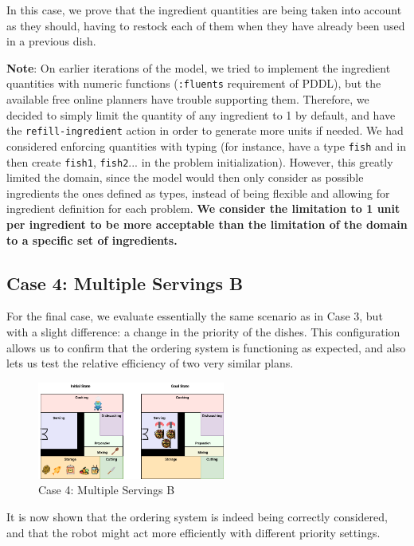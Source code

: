\documentclass{article}
\begin{document}
In this case, we prove that the ingredient quantities are being taken into account as they should, having to restock each of them when they have already been used in a previous dish.

\textbf{Note}: On earlier iterations of the model, we tried to implement the ingredient quantities with numeric functions (\texttt{:fluents} requirement of PDDL), but the available free online planners have trouble supporting them. Therefore, we decided to simply limit the quantity of any ingredient to 1 by default, and have the \texttt{refill-ingredient} action in order to generate more units if needed. We had considered enforcing quantities with typing (for instance, have a type \texttt{fish} and in then create \texttt{fish1}, \texttt{fish2}... in the problem initialization). However, this greatly limited the domain, since the model would then only consider as possible ingredients the ones defined as types, instead of being flexible and allowing for ingredient definition for each problem. \textbf{We consider the limitation to 1 unit per ingredient to be more acceptable than the limitation of the domain to a specific set of ingredients.}

\subsection{Case 4: Multiple Servings B}

For the final case, we evaluate essentially the same scenario as in Case 3, but with a slight difference: a change in the priority of the dishes. This configuration allows us to confirm that the ordering system is functioning as expected, and also lets us test the relative efficiency of two very similar plans.

\begin{figure}[ht]
    \centering
    \includegraphics[width=0.55\textwidth]{illustrations/problem-3-multiple-serving.drawio.png}
    \caption{Case 4: Multiple Servings B}
    \label{fig:initial-state-servingsB}
\end{figure}
\FloatBarrier

It is now shown that the ordering system is indeed being correctly considered, and that the robot might act more efficiently with different priority settings.
\end{document}
